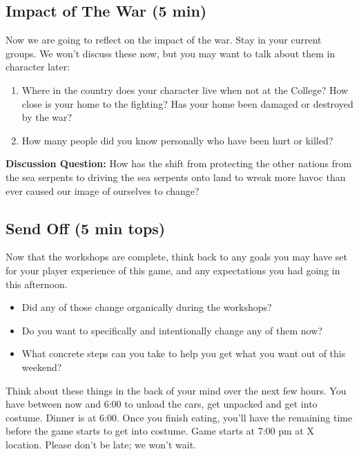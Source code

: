 \documentclass[green]{GL2020}
\begin{document}
\subsection*{Impact of The War (5 min)}
Now we are going to reflect on the impact of the war. Stay in your current groups. We won't discuss these now, but you may want to talk about them in character later:
\begin{enumerate}
	\item Where in the country does your character live when not at the College? How close is your home to the fighting? Has your home been damaged or destroyed by the war?
	\item How many people did you know personally who have been hurt or killed?
\end{enumerate}

\textbf{Discussion Question:} How has the shift from protecting the other nations from the sea serpents to driving the sea serpents onto land to wreak more havoc than ever caused our image of ourselves to change?

\subsection*{Send Off (5 min tops)}
Now that the workshops are complete, think back to any goals you may have set for your player experience of this game, and any expectations you had going in this afternoon. 
\begin{itemize}
	\item Did any of those change organically during the workshops? 
	\item Do you want to specifically and intentionally change any of them now? 
	\item What concrete steps can you take to help you get what you want out of this weekend?
\end{itemize}

Think about these things in the back of your mind over the next few hours. You have between now and 6:00 to unload the cars, get unpacked and get into costume. Dinner is at 6:00. Once you finish eating, you’ll have the remaining time before the game starts to get into costume. Game starts at 7:00 pm at X location. Please don’t be late; we won’t wait.
\end{document}

